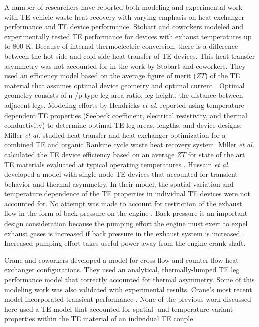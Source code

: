 \documentclass[preprint,authoryear,12pt]{elsarticle}
\begin{document}
A number of researchers have reported both modeling and experimental
work with TE vehicle waste heat recovery with varying emphasis on heat
exchanger performance and TE device performance. Stobart and coworkers
modeled and experimentally tested TE performance for devices with
exhaust temperatures up to 800 K.  Because of internal thermoelectric
conversion, there is a difference between the hot side and cold side
heat transfer of TE devices. This heat transfer asymmetry was not
accounted for in the work by Stobart and coworkers.  They used an
efficiency model based on the average figure of merit ($ZT$) of the TE
material that assumes optimal device geometry and optimal current
\cite{stobart_potential_2009,stobart_potential_2010}.  Optimal
geometry consists of n-/p-type leg area ratio, leg height, the
distance between adjacent legs. Modeling efforts by Hendricks \emph{et
  al.}  \cite{hendricks_advanced_2002,hendricks_thermal_2007} reported
using temperature-dependent TE properties (Seebeck coefficient,
electrical resistivity, and thermal conductivity) to determine optimal
TE leg areas, lengths, and device designs. Miller \emph{et al.}
studied heat transfer and heat exchanger optimization for a combined
TE and organic Rankine cycle waste heat recovery system. Miller
\emph{et al.}  calculated the TE device efficiency based on an average
$ZT$ for state of the art TE materials evaluated at typical operating
temperatures \cite{miller_modeling_2009}.  Hussain \emph{et al.}
developed a model with single node TE devices that accounted for
transient behavior and thermal asymmetry.  In their model, the spatial
variation and temperature dependence of the TE properties in
individual TE devices were not accounted for.  No attempt was made to
account for restriction of the exhaust flow in the form of back
pressure on the engine \cite{hussain_thermoelectric_2009}. Back
pressure is an important design consideration because the pumping
effort the engine must exert to expel exhaust gases is increased if
back pressure in the exhaust system is increased.  Increased pumping
effort takes useful power away from the engine crank shaft.

Crane and coworkers developed a model for cross-flow and counter-flow
heat exchanger configurations.  They used an analytical,
thermally-lumped TE leg performance model that correctly accounted for
thermal asymmetry.  Some of this modeling work was also validated with
experimental results. Crane's most recent model incorporated transient
performance \cite{crane_towards_2001,crane_optimization_2004,%
  crane_introduction_2011}. None of the previous work discussed here
used a TE model that accounted for spatial- and temperature-variant
properties within the TE material of an individual TE couple.
\end{document}
